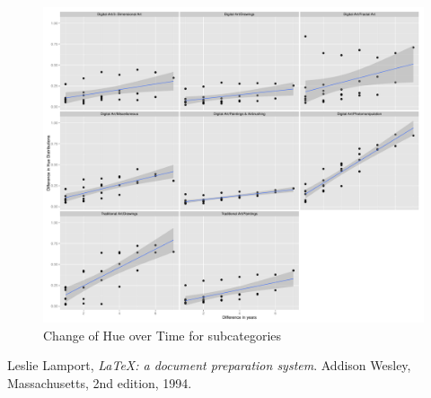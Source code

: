 \documentclass[letterpaper]{article}
\begin{document}
\begin{figure}
    \includegraphics[width = .4\textwidth]{Hue_time_sub_cats}
      \caption{Change of Hue over Time for subcategories}
    \label{fig:pair_diff_subcat}
\end{figure}


\begin{thebibliography}{9}

  Leslie Lamport,
  \emph{\LaTeX: a document preparation system}.
  Addison Wesley, Massachusetts,
  2nd edition,
  1994.
 
\end{thebibliography}
\end{document}
